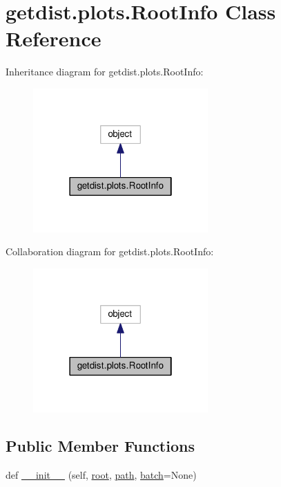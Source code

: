 \hypertarget{classgetdist_1_1plots_1_1RootInfo}{}\section{getdist.\+plots.\+Root\+Info Class Reference}
\label{classgetdist_1_1plots_1_1RootInfo}


Inheritance diagram for getdist.\+plots.\+Root\+Info\+:
\nopagebreak
\begin{figure}[H]
\begin{center}
\leavevmode
\includegraphics[width=190pt]{classgetdist_1_1plots_1_1RootInfo__inherit__graph}
\end{center}
\end{figure}


Collaboration diagram for getdist.\+plots.\+Root\+Info\+:
\nopagebreak
\begin{figure}[H]
\begin{center}
\leavevmode
\includegraphics[width=190pt]{classgetdist_1_1plots_1_1RootInfo__coll__graph}
\end{center}
\end{figure}
\subsection*{Public Member Functions}
\begin{DoxyCompactItemize}
\item 
def \mbox{\hyperlink{classgetdist_1_1plots_1_1RootInfo_ab2cb6f6bc5448a0848836e6a9a62fe1a}{\+\_\+\+\_\+init\+\_\+\+\_\+}} (self, \mbox{\hyperlink{classgetdist_1_1plots_1_1RootInfo_a0a9da48b51f158e5f0f25ceeebd159f4}{root}}, \mbox{\hyperlink{classgetdist_1_1plots_1_1RootInfo_aef4fe3a99208232dfff95b1349ba37e7}{path}}, \mbox{\hyperlink{classgetdist_1_1plots_1_1RootInfo_ab25fd100bd82fad2632364a52d95e5ee}{batch}}=None)
\end{DoxyCompactItemize}
